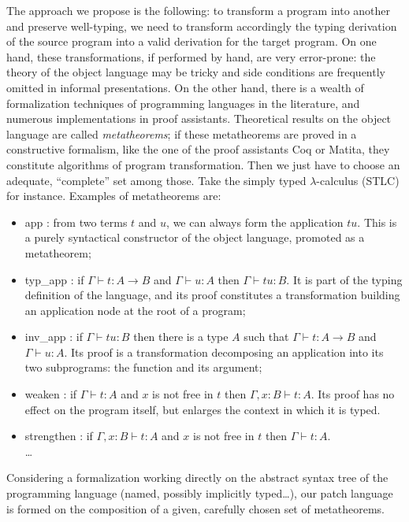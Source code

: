 \documentclass[twoside,a4paper,12pt]{article}
\begin{document}
The approach we propose is the following: to transform a program into
another and preserve well-typing, we need to transform accordingly the
typing derivation of the source program into a valid derivation for
the target program. On one hand, these transformations, if performed
by hand, are very error-prone: the theory of the object language may
be tricky and side conditions are frequently omitted in informal
presentations. On the other hand, there is a wealth of formalization
techniques of programming languages in the literature, and numerous
implementations in proof assistants. Theoretical results on the object
language are called \emph{metatheorems}; if these metatheorems are
proved in a constructive formalism, like the one of the proof
assistants \textsf{Coq} or \textsf{Matita}, they constitute algorithms
of program transformation. Then we just have to choose an adequate,
``complete'' set among those. Take the simply typed $\lambda$-calculus
(STLC) for instance. Examples of metatheorems are:
\begin{itemize}
\item \textsf{app} : from two terms $t$ and $u$, we can always form
  the application $tu$. This is a purely syntactical constructor of
  the object language, promoted as a metatheorem;
\item \textsf{typ\_app} : if $\Gamma \vdash t : A \to B$ and $\Gamma
  \vdash u : A$ then $\Gamma\vdash tu : B$. It is part of the typing
  definition of the language, and its proof constitutes a
  transformation building an application node at the root of a
  program;
\item \textsf{inv\_app} : if $\Gamma \vdash tu : B$ then there is a
  type $A$ such that $\Gamma\vdash t:A\to B$ and $\Gamma\vdash
  u:A$. Its proof is a transformation decomposing an application into
  its two subprograms: the function and its argument;
\item \textsf{weaken} : if $\Gamma\vdash t : A$ and $x$ is not free in
  $t$ then $\Gamma, x:B\vdash t:A$. Its proof has no effect on the
  program itself, but enlarges the context in which it is typed.
\item \textsf{strengthen} : if $\Gamma,x:B\vdash t:A$ and $x$ is not
  free in $t$ then $\Gamma\vdash t:A$.  \\\ldots
\end{itemize}
Considering a formalization working directly on the abstract syntax
tree of the programming language (named, possibly implicitly
typed\ldots), our patch language is formed on the composition of a
given, carefully chosen set of metatheorems. 
\end{document}
